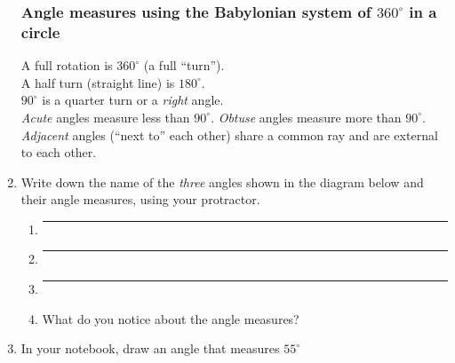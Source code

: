 \begin{enumerate}
\newpage
\subsubsection*{Angle measures using the Babylonian system of $360^\circ$ in a circle}
A full rotation is $360^\circ$ (a full ``turn'').\\[0.5cm]
A half turn (straight line) is $180^\circ$. \\[0.5cm]
$90^\circ$ is a quarter turn or a \emph{right} angle. \\[0.5cm]
\emph{Acute} angles measure less than $90^\circ$. \emph{Obtuse} angles measure more than $90^\circ$. \\[0.5cm]
\emph{Adjacent} angles (``next to'' each other) share a common ray and are external to each other. \vspace{0.2cm}

\item Write down the name of the \emph{three} angles shown in the diagram below and their angle measures, using your protractor. \vspace{1cm}
    \begin{center}
    \end{center}
    \begin{enumerate}
      \item  \rule{4cm}{0.15mm} \bigskip
      \item  \rule{4cm}{0.15mm} \bigskip
      \item  \rule{4cm}{0.15mm} \bigskip
      \item What do you notice about the angle measures?
    \end{enumerate}\vspace{1cm}

\item In your notebook, draw an angle that measures $55^\circ$

\newpage    
\begin{center}
  \end{center}

\end{enumerate}
